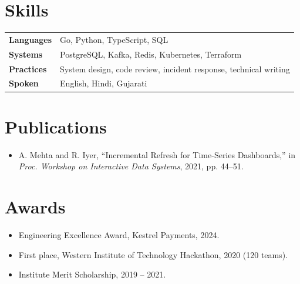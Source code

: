 \documentclass[10pt,a4paper]{article}
\begin{document}
\section{Skills}
\begin{tabular}{@{}p{2.6cm}p{14.4cm}@{}}
  \textbf{Languages}   & Go, Python, TypeScript, SQL \\
  \textbf{Systems}     & PostgreSQL, Kafka, Redis, Kubernetes, Terraform \\
  \textbf{Practices}   & System design, code review, incident response, technical writing \\
  \textbf{Spoken}      & English, Hindi, Gujarati
\end{tabular}

\section{Publications}
\begin{itemize}
  \item A. Mehta and R. Iyer, ``Incremental Refresh for Time-Series Dashboards,'' in \emph{Proc. Workshop on Interactive Data Systems}, 2021, pp. 44--51.
\end{itemize}

\section{Awards}
\begin{itemize}
  \item Engineering Excellence Award, Kestrel Payments, 2024.
  \item First place, Western Institute of Technology Hackathon, 2020 (120 teams).
  \item Institute Merit Scholarship, 2019 -- 2021.
\end{itemize}
\end{document}
